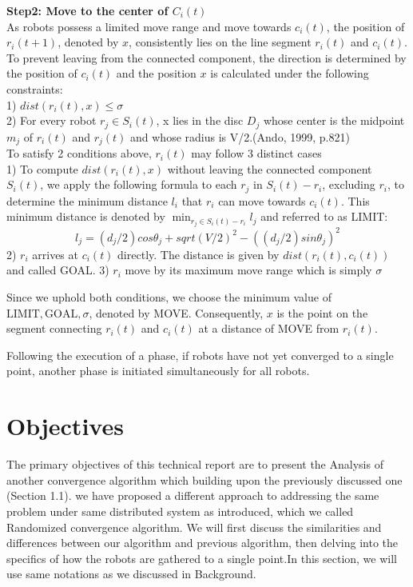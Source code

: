 \documentclass[]{report}
\begin{document}
\textbf{Step2: Move to the center of $C_i(t)$}\\
As robots possess a limited move range and move towards $c_i(t)$, the position of $r_i(t + 1)$, denoted by $x$, consistently lies on the line segment $r_i(t)$ and $c_i(t)$. To prevent leaving from the connected component, the direction is determined by the position of $c_i(t)$ and the position $x$ is calculated under the following constraints:\\
1) $dist(r_i(t), x) \leq \sigma$\\
2) For every robot $r_j \in S_i(t)$, x lies in the disc $D_j$ whose center is the midpoint $m_j$ of $r_i(t)$ and $r_j(t)$ and whose radius is V/2.(Ando, 1999, p.821)\\
To satisfy 2 conditions above, \(r_i(t)\) may follow 3 distinct cases\\
1) To compute $dist(r_i(t), x)$ without leaving the connected component $S_i(t)$, we apply the following formula to each $r_j$ in $S_i(t) - {r_i}$, excluding $r_i$, to determine the minimum distance $l_i$ that $r_i$ can move towards $c_i(t)$. This minimum distance is denoted by $\min_{r_j\in S_i(t) - {r_i}} {l_j}$ and referred to as LIMIT:
\[l_j = (d_j/2)cos\theta_j+sqrt{(V/2)^2 - ((d_j/2)sin\theta_j)^2} \]
2) $r_i$ arrives at $c_i(t)$ directly. The distance is given by $dist(r_i(t), c_i(t))$ and called GOAL.
3) \(r_i\) move by its maximum move range which is simply \(\sigma\)

Since we uphold both conditions, we choose the minimum value of ${ \text{LIMIT}, \text{GOAL}, \sigma}$, denoted by MOVE. Consequently, $x$ is the point on the segment connecting $r_i(t)$ and $c_i(t)$ at a distance of MOVE from $r_i(t)$.

Following the execution of a phase, if robots have not yet converged to a single point, another phase is initiated simultaneously for all robots.




	
\section{Objectives}
The primary objectives of this technical report are to present the Analysis of another convergence algorithm which building upon the previously discussed one (Section 1.1). we have proposed a different approach to addressing the same problem under same distributed system as introduced, which we called Randomized convergence algorithm. We will first discuss the similarities and differences between our algorithm and previous algorithm, then delving into the specifics of how the robots are gathered to a single point.In this section, we will use same notations as we discussed in Background.
\end{document}
